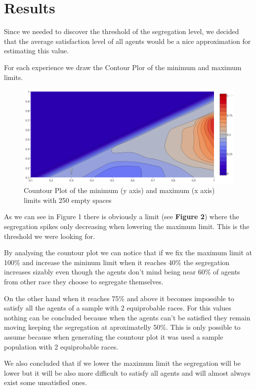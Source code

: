 \documentclass[a4paper,titlepage,11pt]{article}
\begin{document}
\newpage

\section{Results}

Since we needed to discover the threshold of the segregation level, we decided that the average satisfaction level of all agents would be a nice approximation for estimating this value.

For each experience we draw the Contour Plor of the minimum and maximum limits.

\begin{figure}[h]
    \centering
    \includegraphics[scale=0.40]{img/ploty.png}
    \caption{Countour Plot of the minimum (y axis) and maximum (x axis) limits with 250 empty spaces}
\end{figure}

As we can see in Figure 1 there is obviously a limit (see \textbf{Figure 2}) where the segregation spikes only decreasing
when lowering the maximum limit. This is the threshold we were looking for.

By analysing the countour plot we can notice that if we fix the maximum limit at 100\% and increase the mininum limit when
it reaches 40\% the segregation increases sizably even though the agents don't mind being near 60\% of agents from other
race they choose to segregate themselves.

On the other hand when it reaches 75\% and above it becomes impossible to satisfy all the agents of a sample with 2
equiprobable races. For this values nothing can be concluded because when the agents can't be satisfied they remain moving
keeping the segregation at aproximatelly 50\%. This is only possible to assume because when generating the countour plot
it was used a sample population with 2 equiprobable races.

We also concluded that if we lower the maximum limit the segregation will be lower but it will be also more difficult to
satisfy all agents and will almost always exist some unsatisfied ones.
\end{document}
